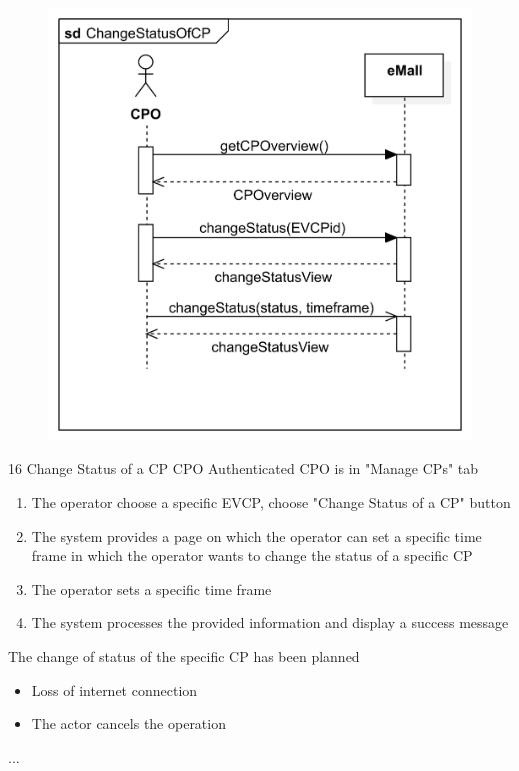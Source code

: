 \usecase
{
    \begin{figure}[H]
        \centering
        \includegraphics[scale=0.9]{src/sequence_diagram/changeStatusCP.png}
    \end{figure}
}
{16}
{Change Status of a CP} %
{CPO} %
{Authenticated CPO is in "Manage CPs" tab} %
{ %
    \begin{enumerate}
        \item The operator choose a specific EVCP, choose "Change Status of a CP" button
        \item The system provides a page on which the operator can set a specific time frame in which the operator wants to change the status of a specific CP
        \item The operator sets a specific time frame
        \item The system processes the provided information and display a success message
    \end{enumerate}
}
{The change of status of the specific CP has been planned} %
{ %
    \begin{itemize}
        \item Loss of internet connection
        \item The actor cancels the operation
    \end{itemize}
}
{ %
    ...
}

